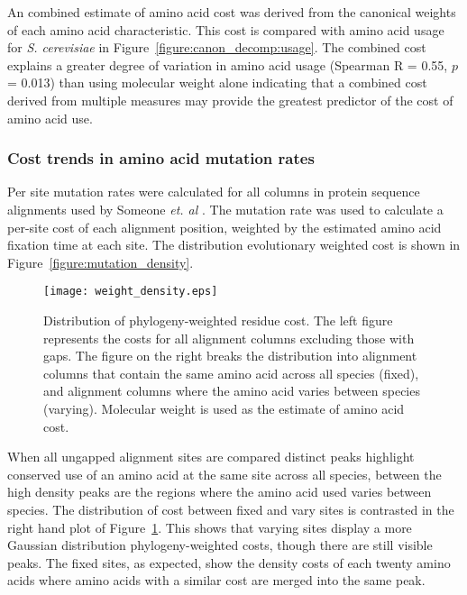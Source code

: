 An combined estimate of amino acid cost was derived from the canonical weights of each amino acid characteristic. This cost is compared with amino acid usage for \emph{S. cerevisiae} in Figure~\ref{figure:canon_decomp:usage}. The combined cost explains a greater degree of variation in amino acid usage (Spearman R = 0.55, $p$ = 0.013) than using molecular weight alone indicating that a combined cost derived from multiple measures may provide the greatest predictor of the cost of amino acid use.


\subsubsection{Cost trends in amino acid mutation rates}

Per site mutation rates were calculated for all columns in protein sequence alignments used by Someone \emph{et. al} \cite{wall2005}. The mutation rate was used to calculate a per-site cost of each alignment position, weighted by the estimated amino acid fixation time at each site. The distribution evolutionary weighted cost is shown in Figure~\vref{figure:mutation_density}.




\begin{figure}
  \centering
  \texttt{[image: weight\_density.eps]}
  \caption[Distribution of phylogeny-weighted residue cost.]{Distribution of phylogeny-weighted residue cost. The left figure represents the costs for all alignment columns excluding those with gaps. The figure on the right breaks the distribution into alignment columns that contain the same amino acid across all species (fixed), and alignment columns where the amino acid varies between species (varying). Molecular weight is used as the estimate of amino acid cost.}
  \label{figure:mutation_density}
\end{figure}

When all ungapped alignment sites are compared distinct peaks highlight conserved use of an amino acid at the same site across all species, between the high density peaks are the regions where the amino acid used varies between species. The distribution of cost between fixed and vary sites is contrasted in the right hand plot of Figure~\ref{figure:mutation_density}. This shows that varying sites display a more Gaussian distribution phylogeny-weighted costs, though there are still visible peaks. The fixed sites, as expected, show the density costs of each twenty amino acids where amino acids with a similar cost are merged into the same peak.

